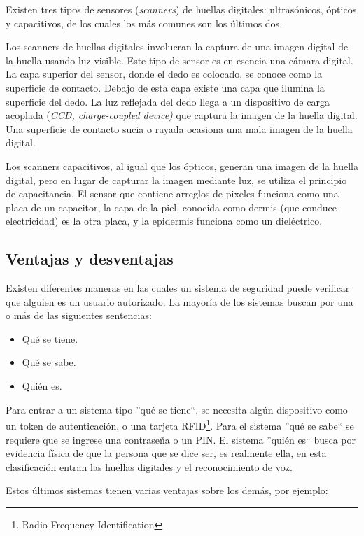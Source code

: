 Existen tres tipos de sensores (\textit{scanners}) de huellas digitales: ultrasónicos, ópticos y capacitivos, de los cuales los más comunes son los últimos dos.

Los scanners de huellas digitales involucran la captura de una imagen digital de la huella usando luz visible. Este tipo de sensor es en esencia una cámara digital. La capa superior del sensor, donde el dedo es colocado, se conoce como la superficie de contacto. Debajo de esta capa existe una capa que ilumina la superficie del dedo. La luz reflejada del dedo llega a un dispositivo de carga acoplada (\textit{CCD, charge-coupled device)} que captura la imagen de la huella digital. Una superficie de contacto sucia o rayada ocasiona una mala imagen de la huella digital.

Los scanners capacitivos, al igual que los ópticos, generan una imagen de la huella digital, pero en lugar de capturar la imagen mediante luz, se utiliza el principio de capacitancia. El sensor que contiene arreglos de pixeles funciona como una placa de un capacitor, la  capa de la piel, conocida como dermis (que conduce electricidad) es la otra placa, y la epidermis funciona como un dieléctrico.

\subsection{Ventajas y desventajas}
\label{sec:fp_pros_cons}

Existen diferentes maneras en las cuales un sistema de seguridad puede verificar que alguien es un usuario autorizado. La mayoría de los sistemas buscan por una o más de las siguientes sentencias:

\begin{itemize}
 \item Qué se tiene.
 \item Qué se sabe.
 \item Quién es.
\end{itemize}

Para entrar a un sistema tipo ''qué se tiene``, se necesita algún dispositivo como un token de autenticación, o una tarjeta RFID\footnote{Radio Frequency Identification}. Para el sistema ''qué se sabe`` se requiere que se ingrese una contraseña o un PIN. El sistema ''quién es`` busca por evidencia física de que la persona que se dice ser, es realmente ella, en esta clasificación entran las huellas digitales y el reconocimiento de voz.

Estos últimos sistemas tienen varias ventajas sobre los demás, por ejemplo:

